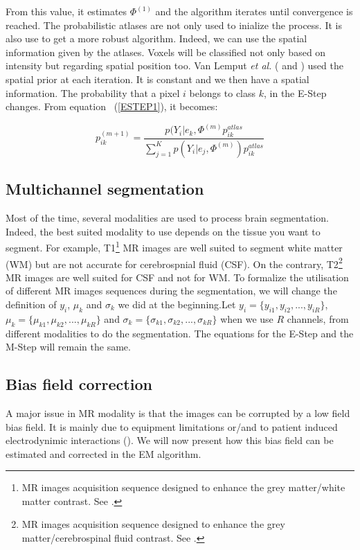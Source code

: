 From this value, it estimates $\Phi^{(1)}$ and the algorithm iterates until convergence is reached. The probabilistic atlases are not only used to inialize the process. It is also use to get a more robust algorithm. Indeed, we can use the spatial information given by the atlases. Voxels will be classified not only based on intensity but regarding spatial position too. Van Lemput \textit{et al.} (\cite{8} and \cite{9}) used the spatial prior at each iteration. It is constant and we then have a spatial information. The probability that a pixel $i$ belongs to class $k$, in the E-Step changes. From equation ~(\ref{ESTEP1}), it becomes:

  \begin{equation*}\label{ESTEP2}
  p_{ik}^{(m+1)} = \frac{p(Y_i|e_k,\Phi^{(m)}p_{ik}^{atlas}}{\sum_{j=1}^K   p(Y_i|e_j,\Phi^{(m)}) p_{ik}^{atlas}}  
  \end{equation*}

%
\subsection{Multichannel segmentation}\label{multichannel}
Most of the time, several modalities are used to process brain segmentation. Indeed, the best suited modality to use depends on the tissue you want to segment. For example, T1\footnote{MR images acquisition sequence designed to enhance the grey matter/white matter contrast. See \cite{12}.} MR images are well suited to segment white matter (WM) but are not accurate for cerebrospnial fluid (CSF). On the contrary, T2\footnote{MR images acquisition sequence designed to enhance the grey matter/cerebrospinal fluid contrast. See \cite{12}.} MR images are well suited for CSF and not for WM. To formalize the utilisation of different MR images sequences during the segmentation, we will change the definition of $y_i$, $\mu_k$ and $\sigma_k$ we did at the beginning.Let $y_i = \{y_{i1},y_{i2}, ..., y_{iR}\}$, $\mu_k = \{\mu_{k1},\mu_{k2}, ..., \mu_{kR}\}$ and $\sigma_k = \{\sigma_{k1},\sigma_{k2}, ..., \sigma_{kR}\}$ when we use $R$ channels, from different modalities to do the segmentation. The equations for the E-Step and the M-Step will remain the same.
%
\subsection{Bias field correction}\label{biasfield}
A major issue in MR modality is that the images can be corrupted by a low field bias field. It is mainly due to equipment limitations or/and to patient induced electrodynimic interactions (\cite{12}). We will now present how this bias field can be estimated and corrected in the EM algorithm.
%
